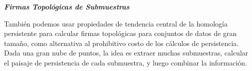\textbf{\textit{\large Firmas Topol\'ogicas de Submuestras}}

Tambi\'en podemos usar propiedades de tendencia central de la homolog\'ia persistente para
calcular firmas topol\'ogicas para conjuntos de datos de gran tama\~{n}o,
como alternativa al prohibitivo costo de los c\'alculos de persistencia.
Dada una gran nube de puntos, la idea es extraer muchas submuestras,
calcular el paisaje de persistencia de cada submuestra, y luego combinar la informaci\'on.
